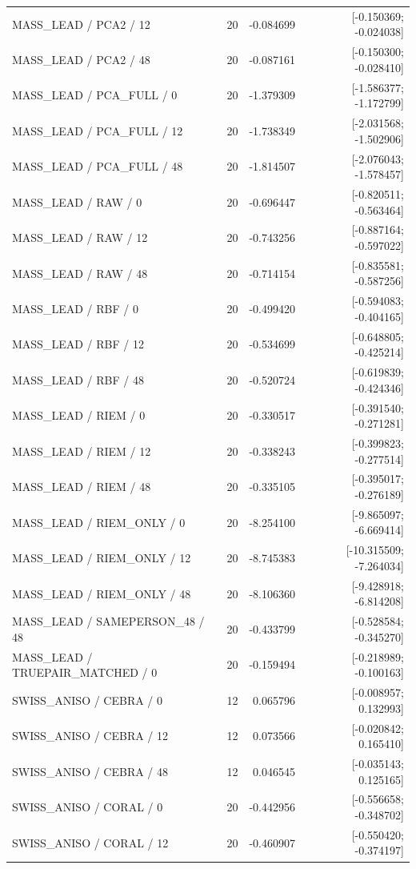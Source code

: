 \begin{longtable}{p{.56\linewidth}rrr}
MASS\_LEAD / PCA2 / 12 & 20 & -0.084699 & [-0.150369; -0.024038] \\
MASS\_LEAD / PCA2 / 48 & 20 & -0.087161 & [-0.150300; -0.028410] \\
MASS\_LEAD / PCA\_FULL / 0 & 20 & -1.379309 & [-1.586377; -1.172799] \\
MASS\_LEAD / PCA\_FULL / 12 & 20 & -1.738349 & [-2.031568; -1.502906] \\
MASS\_LEAD / PCA\_FULL / 48 & 20 & -1.814507 & [-2.076043; -1.578457] \\
MASS\_LEAD / RAW / 0 & 20 & -0.696447 & [-0.820511; -0.563464] \\
MASS\_LEAD / RAW / 12 & 20 & -0.743256 & [-0.887164; -0.597022] \\
MASS\_LEAD / RAW / 48 & 20 & -0.714154 & [-0.835581; -0.587256] \\
MASS\_LEAD / RBF / 0 & 20 & -0.499420 & [-0.594083; -0.404165] \\
MASS\_LEAD / RBF / 12 & 20 & -0.534699 & [-0.648805; -0.425214] \\
MASS\_LEAD / RBF / 48 & 20 & -0.520724 & [-0.619839; -0.424346] \\
MASS\_LEAD / RIEM / 0 & 20 & -0.330517 & [-0.391540; -0.271281] \\
MASS\_LEAD / RIEM / 12 & 20 & -0.338243 & [-0.399823; -0.277514] \\
MASS\_LEAD / RIEM / 48 & 20 & -0.335105 & [-0.395017; -0.276189] \\
MASS\_LEAD / RIEM\_ONLY / 0 & 20 & -8.254100 & [-9.865097; -6.669414] \\
MASS\_LEAD / RIEM\_ONLY / 12 & 20 & -8.745383 & [-10.315509; -7.264034] \\
MASS\_LEAD / RIEM\_ONLY / 48 & 20 & -8.106360 & [-9.428918; -6.814208] \\
MASS\_LEAD / SAMEPERSON\_48 / 48 & 20 & -0.433799 & [-0.528584; -0.345270] \\
MASS\_LEAD / TRUEPAIR\_MATCHED / 0 & 20 & -0.159494 & [-0.218989; -0.100163] \\
SWISS\_ANISO / CEBRA / 0 & 12 & 0.065796 & [-0.008957; 0.132993] \\
SWISS\_ANISO / CEBRA / 12 & 12 & 0.073566 & [-0.020842; 0.165410] \\
SWISS\_ANISO / CEBRA / 48 & 12 & 0.046545 & [-0.035143; 0.125165] \\
SWISS\_ANISO / CORAL / 0 & 20 & -0.442956 & [-0.556658; -0.348702] \\
SWISS\_ANISO / CORAL / 12 & 20 & -0.460907 & [-0.550420; -0.374197] \\

\end{longtable}
